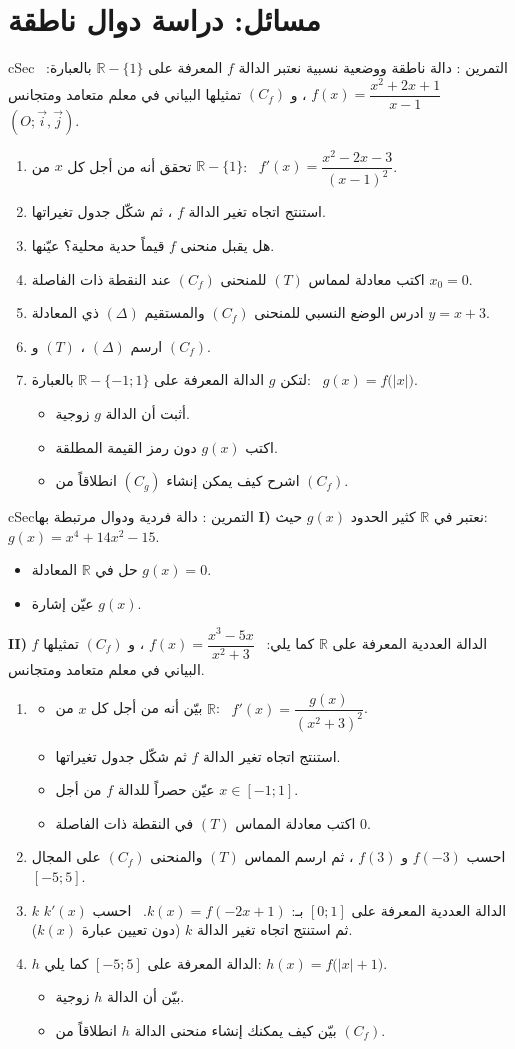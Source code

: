 \documentclass[12pt,a4paper]{article}
\newenvironment{BOX}[2]{\begin{otherlanguage}{english}\begin{arbox}{#1}{#2}}{\end{arbox}\end{otherlanguage}}
\newcounter{exo}
\newenvironment{tamrin}[1]{\stepcounter{exo}\begin{BOX}{cSec}{التمرين \theexo: #1}}{\end{BOX}}
\newcommand{\R}{\mathbb{R}}
\newenvironment{sq}{\begin{itemize}[leftmargin=2.4em,itemsep=3pt]}{\end{itemize}}
\newcommand{\qa}{\item[(أ)]}\newcommand{\qb}{\item[(ب)]}\newcommand{\qc}{\item[(جـ)]}\newcommand{\qd}{\item[(د)]}\newcommand{\qe}{\item[(هـ)]}
\begin{document}
\section{مسائل: دراسة دوال ناطقة}
\begin{tamrin}{دالة ناطقة ووضعية نسبية}
نعتبر الدالة $f$ المعرفة على $\R-\{1\}$ بالعبارة: \ $f(x)=\dfrac{x^2+2x+1}{x-1}$ ، و $(C_f)$ تمثيلها البياني في معلم متعامد ومتجانس $(O;\vec i,\vec j)$.
\begin{enumerate}
\item تحقق أنه من أجل كل $x$ من $\R-\{1\}$: \ $f'(x)=\dfrac{x^2-2x-3}{(x-1)^2}$.
\item استنتج اتجاه تغير الدالة $f$ ، ثم شكّل جدول تغيراتها.
\item هل يقبل منحنى $f$ قيماً حدية محلية؟ عيّنها.
\item اكتب معادلة لمماس $(T)$ للمنحنى $(C_f)$ عند النقطة ذات الفاصلة $x_0=0$.
\item ادرس الوضع النسبي للمنحنى $(C_f)$ والمستقيم $(\Delta)$ ذي المعادلة $y=x+3$.
\item ارسم $(\Delta)$ ، $(T)$ و $(C_f)$.
\item لتكن $g$ الدالة المعرفة على $\R-\{-1;1\}$ بالعبارة: \ $g(x)=f\big(|x|\big)$.
\begin{sq}
\qa أثبت أن الدالة $g$ زوجية.
\qb اكتب $g(x)$ دون رمز القيمة المطلقة.
\qc اشرح كيف يمكن إنشاء $(C_g)$ انطلاقاً من $(C_f)$.
\end{sq}
\end{enumerate}
\end{tamrin}

\begin{tamrin}{دالة فردية ودوال مرتبطة بها}
\textbf{I)} نعتبر في $\R$ كثير الحدود $g(x)$ حيث: $g(x)=x^4+14x^2-15$.
\begin{sq}
\qa حل في $\R$ المعادلة $g(x)=0$.
\qb عيّن إشارة $g(x)$.
\end{sq}
\textbf{II)} $f$ الدالة العددية المعرفة على $\R$ كما يلي: \ $f(x)=\dfrac{x^3-5x}{x^2+3}$ ، و $(C_f)$ تمثيلها البياني في معلم متعامد ومتجانس.
\begin{enumerate}
\item
\begin{sq}
\qa بيّن أنه من أجل كل $x$ من $\R$: \ $f'(x)=\dfrac{g(x)}{(x^2+3)^2}$.
\qb استنتج اتجاه تغير الدالة $f$ ثم شكّل جدول تغيراتها.
\qc عيّن حصراً للدالة $f$ من أجل $x\in[-1;1]$.
\qd اكتب معادلة المماس $(T)$ في النقطة ذات الفاصلة $0$.
\end{sq}
\item احسب $f(-3)$ و $f(3)$ ، ثم ارسم المماس $(T)$ والمنحنى $(C_f)$ على المجال $[-5;5]$.
\item $k$ الدالة العددية المعرفة على $[0;1]$ بـ: $k(x)=f(-2x+1)$. \ احسب $k'(x)$ ثم استنتج اتجاه تغير الدالة $k$ (دون تعيين عبارة $k(x)$).
\item $h$ الدالة المعرفة على $[-5;5]$ كما يلي: $h(x)=f\big(|x|+1\big)$.
\begin{sq}
\qa بيّن أن الدالة $h$ زوجية.
\qb بيّن كيف يمكنك إنشاء منحنى الدالة $h$ انطلاقاً من $(C_f)$.
\end{sq}
\end{enumerate}
\end{tamrin}
\end{document}
